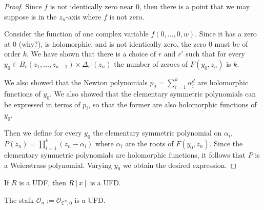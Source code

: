 \begin{proof}
Since $f$ is not identically zero near $0$, then there is a point that we may
suppose is in the $z_n$-axis where $f$ is not zero.

Consider the function of one complex variable $f(0,\ldots,0,w)$. Since it has a
zero at $0$ (why?), is holomorphic, and is not identically zero, the zero $0$
must be of order $k$. We have shown that there is a choice of $r$ and  $r'$ such
that for every $y_0 \in B_r(z_1,\ldots,z_{n-1})\times \Delta_{r'}(z_n)$ the
number of zeroes of $F(y_0,z_n)$ is $k$.

We also showed that the Newton polynomials $p_d=\sum_{i=1}^k\alpha_i^d$ are
holomorphic functions of $y_0$. We also showed that the elementary symmetric
polynomials can be expressed in terms of $p_i$, so that the former are also
holomorphic functions of $y_0$.

Then we define for every $y_0$ the elementary symmetric polynomial on
$\alpha_i$, $P(z_n)=\prod_{i=1}^k(z_n-\alpha_i)$ where $\alpha_i$ are the roots 
of $F(y_0,z_n)$. Since the elementary symmetric polynomials are holomorphic
functions, it follows that $P$ is a Weierstrass polynomial. Varying $y_0$ we
obtain the desired expression. 
\end{proof}

\begin{lemma}
\label{lemma-Gauss-UFD}
If $R$ is a UDF, then $R[x]$ is a UFD.
\end{lemma}

\begin{lemma}
\label{lemma-stalk-is-UFD}
The stalk $\mathcal{O}_n:=\mathcal{O}_{\mathbb{C}^n,0}$ is a UFD.
\end{lemma}

